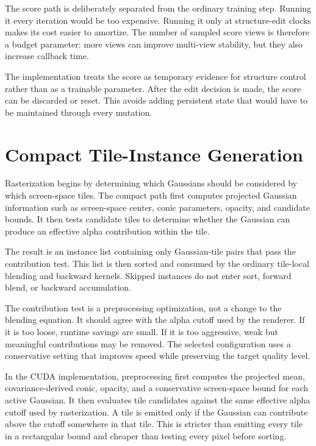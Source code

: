 The score path is deliberately separated from the ordinary training step. Running it every iteration would be too expensive. Running it only at structure-edit clocks makes its cost easier to amortize. The number of sampled score views is therefore a budget parameter: more views can improve multi-view stability, but they also increase callback time.

The implementation treats the score as temporary evidence for structure control rather than as a trainable parameter. After the edit decision is made, the score can be discarded or reset. This avoids adding persistent state that would have to be maintained through every mutation.

\section{Compact Tile-Instance Generation}

Rasterization begins by determining which Gaussians should be considered by which screen-space tiles. The compact path first computes projected Gaussian information such as screen-space center, conic parameters, opacity, and candidate bounds. It then tests candidate tiles to determine whether the Gaussian can produce an effective alpha contribution within the tile.

The result is an instance list containing only Gaussian-tile pairs that pass the contribution test. This list is then sorted and consumed by the ordinary tile-local blending and backward kernels. Skipped instances do not enter sort, forward blend, or backward accumulation.

The contribution test is a preprocessing optimization, not a change to the blending equation. It should agree with the alpha cutoff used by the renderer. If it is too loose, runtime savings are small. If it is too aggressive, weak but meaningful contributions may be removed. The selected configuration uses a conservative setting that improves speed while preserving the target quality level.

In the CUDA implementation, preprocessing first computes the projected mean, covariance-derived conic, opacity, and a conservative screen-space bound for each active Gaussian. It then evaluates tile candidates against the same effective alpha cutoff used by rasterization. A tile is emitted only if the Gaussian can contribute above the cutoff somewhere in that tile. This is stricter than emitting every tile in a rectangular bound and cheaper than testing every pixel before sorting.

